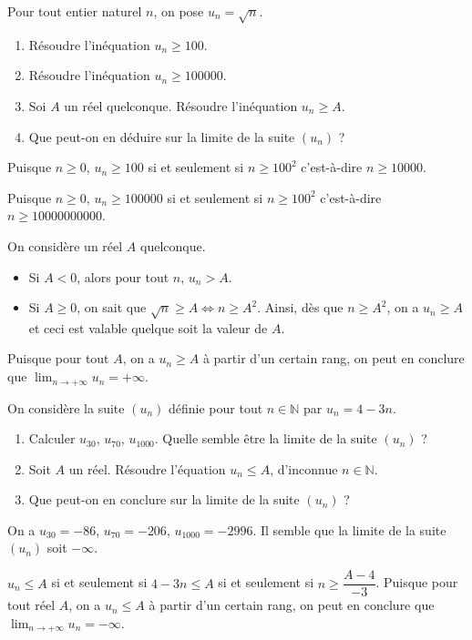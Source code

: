\documentclass[11pt,fleqn]{book} %
\begin{document}
\begin{exercise}[topic=lim01] Pour tout entier naturel $n$, on pose $u_n=\sqrt{n}$.
\begin{enumerate}
\item Résoudre l'inéquation $u_n \geqslant 100$.
\item Résoudre l'inéquation $u_n \geqslant 100000$.
\item Soi $A$ un réel quelconque. Résoudre l'inéquation $u_n \geqslant A$.
\item Que peut-on en déduire sur la limite de la suite $(u_n)$ ?
\end{enumerate}
\end{exercise}
\begin{solution}Puisque $n \geqslant 0$, $u_n \geqslant 100$ si et seulement si $n \geqslant 100^2$ c'est-à-dire $n \geqslant 10000$.

Puisque $n \geqslant 0$, $u_n \geqslant 100000$ si et seulement si $n \geqslant 100^2$ c'est-à-dire $n \geqslant 10000000000$.

On considère un réel $A$ quelconque.
\begin{itemize}
\item Si $A<0$, alors pour tout $n$, $u_n>A$.
\item Si $A\geqslant 0$, on sait que $\sqrt{n} \geqslant A \Leftrightarrow n \geqslant A^2$. Ainsi, dès que $n\geqslant A^2$, on a $u_n \geqslant A$ et ceci est valable quelque soit la valeur de $A$.
\end{itemize}

Puisque pour tout $A$, on a $u_n \geqslant A$ à partir d'un certain rang, on peut en conclure que $\displaystyle \lim _{n\to +\infty} u_n = +\infty$.\end{solution}



\begin{exercise}[topic=lim01]On considère la suite $(u_n)$ définie pour tout $n\in \mathbb{N}$ par  $u_n=4-3n$.
\begin{enumerate}
\item Calculer $u_{30}$, $u_{70}$, $u_{1000}$. Quelle semble être la limite de la suite $(u_n)$ ?
\item Soit $A$ un réel. Résoudre l'équation $u_n \leqslant A$, d'inconnue $n\in\mathbb{N}$.
\item Que peut-on en conclure sur la limite de la suite $(u_n)$ ?
\end{enumerate}
\end{exercise}
\begin{solution}On a $u_{30}=-86$, $u_{70}=-206$, $u_{1000}=-2996$. Il semble que la limite de la suite $(u_n)$ soit $-\infty$.

$u_n\leqslant A$ si et seulement si $4-3n \leqslant A$ si et seulement si $n\geqslant \dfrac{A-4}{-3}$. Puisque pour tout réel $A$, on a $u_n \leqslant A$ à partir d'un certain rang, on peut en conclure que $\displaystyle \lim _{n\to +\infty} u_n = -\infty$.\end{solution}
\end{document}
